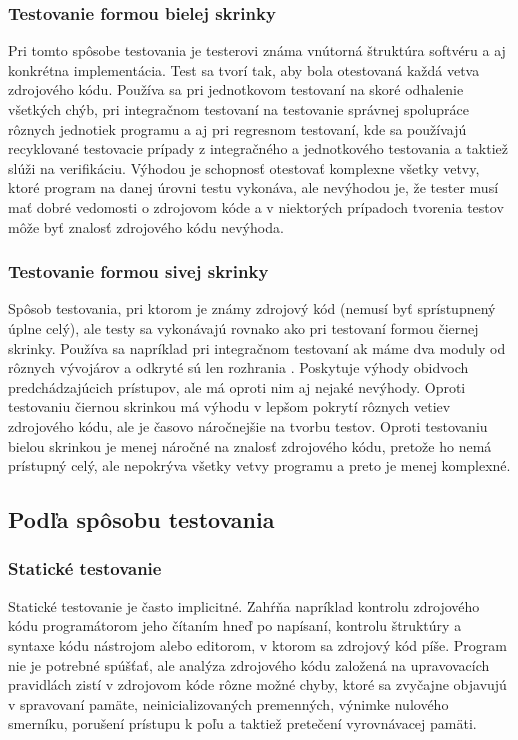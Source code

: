 \documentclass[11pt,twoside,slovak,a4paper]{article}
\begin{document}
		\subsubsection{Testovanie formou bielej skrinky} 
			Pri tomto spôsobe testovania je testerovi známa vnútorná štruktúra softvéru a aj konkrétna implementácia. Test sa tvorí tak, aby bola otestovaná každá vetva zdrojového kódu\cite{EST2002}. Používa sa pri jednotkovom testovaní na skoré odhalenie všetkých chýb, pri integračnom testovaní na testovanie správnej spolupráce rôznych jednotiek programu a aj pri regresnom testovaní, kde sa používajú recyklované testovacie prípady z integračného a jednotkového testovania a taktiež slúži na verifikáciu. Výhodou je schopnosť otestovať komplexne všetky vetvy, ktoré program na danej úrovni testu vykonáva, ale nevýhodou je, že tester musí mať dobré vedomosti o zdrojovom kóde a v niektorých prípadoch tvorenia testov môže byť znalosť zdrojového kódu nevýhoda.
		\subsubsection{Testovanie formou sivej skrinky} 
			Spôsob testovania, pri ktorom je známy zdrojový kód (nemusí byť sprístupnený úplne celý), ale testy sa vykonávajú rovnako ako pri testovaní formou čiernej skrinky. Používa sa napríklad pri integračnom testovaní ak máme dva moduly od rôznych vývojárov a odkryté sú len rozhrania \cite{EST2002}. Poskytuje výhody obidvoch predchádzajúcich prístupov, ale má oproti nim aj nejaké nevýhody. Oproti testovaniu čiernou skrinkou má výhodu v lepšom pokrytí rôznych vetiev zdrojového kódu, ale je časovo náročnejšie na tvorbu testov. Oproti testovaniu bielou skrinkou je menej náročné na znalosť zdrojového kódu, pretože ho nemá prístupný celý, ale nepokrýva všetky vetvy programu a preto je menej komplexné.
	
	\subsection{Podľa spôsobu testovania}
		\subsubsection{Statické testovanie}
			Statické testovanie je často implicitné. Zahŕňa napríklad kontrolu zdrojového kódu programátorom jeho čítaním hneď po napísaní, kontrolu štruktúry a syntaxe kódu nástrojom alebo editorom, v ktorom sa zdrojový kód píše. Program nie je potrebné spúšťať, ale analýza zdrojového kódu založená na upravovacích pravidlách zistí v zdrojovom kóde rôzne možné chyby, ktoré sa zvyčajne objavujú v spravovaní pamäte, neinicializovaných premenných, výnimke nulového smerníku, porušení prístupu k poľu a taktiež pretečení vyrovnávacej pamäti\cite{Wei2014}.
\end{document}
